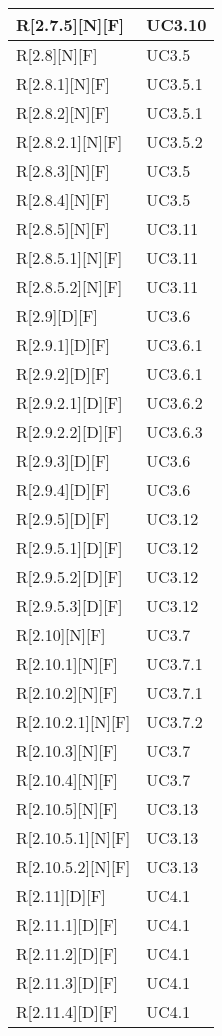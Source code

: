 \begin{longtable}{X | X}
\hline
R[2.7.5][N][F] & UC3.10 \\
\hline
R[2.8][N][F] & UC3.5 \\
\hline
R[2.8.1][N][F] & UC3.5.1 \\
\hline
R[2.8.2][N][F] & UC3.5.1 \\
\hline
R[2.8.2.1][N][F] & UC3.5.2 \\
\hline
R[2.8.3][N][F] & UC3.5 \\
\hline
R[2.8.4][N][F] & UC3.5 \\
\hline
R[2.8.5][N][F] & UC3.11 \\
\hline
R[2.8.5.1][N][F] & UC3.11 \\
\hline
R[2.8.5.2][N][F] & UC3.11 \\
\hline
R[2.9][D][F] & UC3.6 \\
\hline
R[2.9.1][D][F] & UC3.6.1 \\
\hline
R[2.9.2][D][F] & UC3.6.1 \\
\hline
R[2.9.2.1][D][F] & UC3.6.2 \\
\hline
R[2.9.2.2][D][F] & UC3.6.3 \\
\hline
R[2.9.3][D][F] & UC3.6 \\
\hline
R[2.9.4][D][F] & UC3.6 \\
\hline
R[2.9.5][D][F] & UC3.12 \\
\hline
R[2.9.5.1][D][F] & UC3.12 \\
\hline
R[2.9.5.2][D][F] & UC3.12 \\
\hline
R[2.9.5.3][D][F] & UC3.12 \\
\hline
R[2.10][N][F] & UC3.7 \\
\hline
R[2.10.1][N][F] & UC3.7.1 \\
\hline
R[2.10.2][N][F] & UC3.7.1 \\
\hline
R[2.10.2.1][N][F] & UC3.7.2 \\
\hline
R[2.10.3][N][F] & UC3.7 \\
\hline
R[2.10.4][N][F] & UC3.7 \\
\hline
R[2.10.5][N][F] & UC3.13 \\
\hline
R[2.10.5.1][N][F] & UC3.13 \\
\hline
R[2.10.5.2][N][F] & UC3.13 \\
\hline
R[2.11][D][F] & UC4.1 \\
\hline
R[2.11.1][D][F] & UC4.1 \\
\hline
R[2.11.2][D][F] & UC4.1 \\
\hline
R[2.11.3][D][F] & UC4.1 \\
\hline
R[2.11.4][D][F] & UC4.1 \\

\end{longtable}

